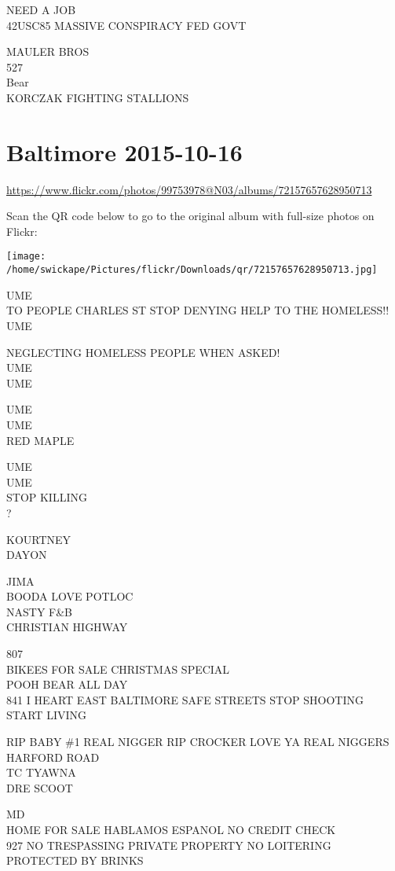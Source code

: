 \documentclass[10pt,letterpaper]{article}
\begin{document}
NEED A JOB\\
42USC85 MASSIVE CONSPIRACY FED GOVT

MAULER BROS\\
527\\
Bear\\
KORCZAK FIGHTING STALLIONS


\section*{Baltimore 2015-10-16}

\url{https://www.flickr.com/photos/99753978@N03/albums/72157657628950713}

Scan the QR code below to go to the original album with full-size photos on Flickr:

\texttt{[image: /home/swickape/Pictures/flickr/Downloads/qr/72157657628950713.jpg]}


UME\\
TO PEOPLE CHARLES ST STOP DENYING HELP TO THE HOMELESS!!\\
UME

NEGLECTING HOMELESS PEOPLE WHEN ASKED!\\
UME\\
UME

UME\\
UME\\
RED MAPLE

UME\\
UME\\
STOP KILLING\\
?

KOURTNEY\\
DAYON

JIMA\\
BOODA LOVE POTLOC\\
NASTY F\&B\\
CHRISTIAN HIGHWAY

807\\
BIKEES FOR SALE CHRISTMAS SPECIAL\\
POOH BEAR ALL DAY\\
841 I HEART EAST BALTIMORE SAFE STREETS STOP SHOOTING START LIVING

RIP BABY \#1  REAL NIGGER RIP CROCKER LOVE YA REAL NIGGERS\\
HARFORD ROAD\\
TC TYAWNA\\
DRE SCOOT

MD\\
HOME FOR SALE HABLAMOS ESPANOL NO CREDIT CHECK\\
927 NO TRESPASSING PRIVATE PROPERTY NO LOITERING\\
PROTECTED BY BRINKS
\end{document}
